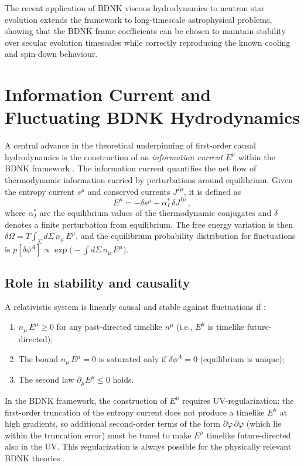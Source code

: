 The recent application of BDNK viscous hydrodynamics to neutron star
evolution \citep{NSevolutionBDNK2025} extends the framework to
long-timescale astrophysical problems, showing that the BDNK frame
coefficients can be chosen to maintain stability over secular
evolution timescales while correctly reproducing the known cooling
and spin-down behaviour.

\section{Information Current and Fluctuating BDNK Hydrodynamics}
\label{sec:info-current-fluctuations}

A central advance in the theoretical underpinning of first-order causal
hydrodynamics is the construction of an \emph{information current}
$E^{\mu}$ within the BDNK framework
\citep{GavassinoInfoCurrentBDNK2024}.  The information current quantifies
the net flow of thermodynamic information carried by perturbations around
equilibrium.  Given the entropy current $s^{\mu}$ and conserved currents
$J^{I\mu}$, it is defined as
\begin{equation}
  E^{\mu} = -\delta s^{\mu} - \alpha_{I}^{*}\,\delta J^{I\mu}\,,
  \label{eq:info-current-def}
\end{equation}
where $\alpha_{I}^{*}$ are the equilibrium values of the thermodynamic
conjugates and $\delta$ denotes a finite perturbation from equilibrium.
The free energy variation is then
$\delta\Omega = T\!\int_{\Sigma}\! d\Sigma\, n_{\mu}\,E^{\mu}$,
and the equilibrium probability distribution for fluctuations is
$p[\delta\phi^{A}] \propto \exp\!\bigl(-\!\int\! d\Sigma\, n_{\mu}\,E^{\mu}\bigr)$.

\subsection{Role in stability and causality}

A relativistic system is linearly causal and stable against fluctuations
if \citep{GavassinoInfoCurrentBDNK2024}:
\begin{enumerate}
  \item $n_{\mu}\,E^{\mu} \ge 0$ for any past-directed timelike $n^{\mu}$
    (i.e., $E^{\mu}$ is timelike future-directed);
  \item The bound $n_{\mu}\,E^{\mu} = 0$ is saturated only if
    $\delta\phi^{A} = 0$ (equilibrium is unique);
  \item The second law $\partial_{\mu}E^{\mu} \le 0$ holds.
\end{enumerate}
In the BDNK framework, the construction of $E^{\mu}$ requires
UV-regularization: the first-order truncation of the entropy current
does not produce a timelike $E^{\mu}$ at high gradients, so
additional second-order terms of the form $\partial\varphi\,\partial\varphi$
(which lie within the truncation error) must be tuned to make
$E^{\mu}$ timelike future-directed also in the UV.  This regularization
is always possible for the physically relevant BDNK theories
\citep{GavassinoInfoCurrentBDNK2024}.

